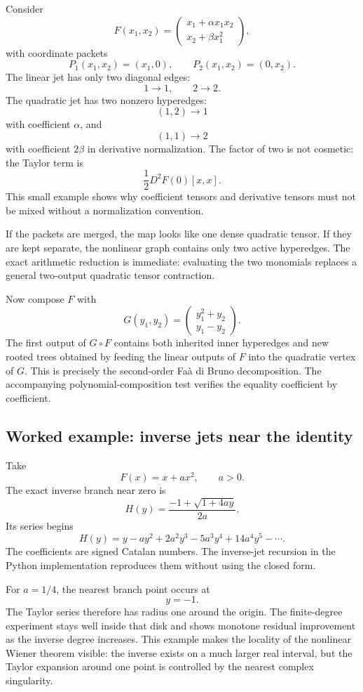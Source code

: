 \documentclass[11pt]{article}
\theoremstyle{definition}
\theoremstyle{remark}
\begin{document}
Consider
\[
F(x_1,x_2)
=
\begin{pmatrix}
x_1+\alpha x_1x_2\\
x_2+\beta x_1^2
\end{pmatrix},
\]
with coordinate packets
\[
P_1(x_1,x_2)=(x_1,0),
\qquad
P_2(x_1,x_2)=(0,x_2).
\]
The linear jet has only two diagonal edges:
\[
1\to1,
\qquad
2\to2.
\]
The quadratic jet has two nonzero hyperedges:
\[
(1,2)\to1
\]
with coefficient $\alpha$, and
\[
(1,1)\to2
\]
with coefficient $2\beta$ in derivative normalization.  The factor of two is not cosmetic: the Taylor term is
\[
\frac12D^2F(0)[x,x].
\]
This small example shows why coefficient tensors and derivative tensors must not be mixed without a normalization convention.

If the packets are merged, the map looks like one dense quadratic tensor.  If they are kept separate, the nonlinear graph contains only two active hyperedges.  The exact arithmetic reduction is immediate: evaluating the two monomials replaces a general two-output quadratic tensor contraction.

Now compose $F$ with
\[
G(y_1,y_2)
=
\begin{pmatrix}
y_1^2+y_2\\
y_1-y_2
\end{pmatrix}.
\]
The first output of $G\circ F$ contains both inherited inner hyperedges and new rooted trees obtained by feeding the linear outputs of $F$ into the quadratic vertex of $G$.  This is precisely the second-order Fa\`a di Bruno decomposition.  The accompanying polynomial-composition test verifies the equality coefficient by coefficient.

\subsection{Worked example: inverse jets near the identity}

Take
\[
F(x)=x+ax^2,
\qquad a>0.
\]
The exact inverse branch near zero is
\[
H(y)
=
\frac{-1+\sqrt{1+4ay}}{2a}.
\]
Its series begins
\[
H(y)
=
y-ay^2+2a^2y^3-5a^3y^4+14a^4y^5-\cdots.
\]
The coefficients are signed Catalan numbers.  The inverse-jet recursion in the Python implementation reproduces them without using the closed form.

For $a=1/4$, the nearest branch point occurs at
\[
y=-1.
\]
The Taylor series therefore has radius one around the origin.  The finite-degree experiment stays well inside that disk and shows monotone residual improvement as the inverse degree increases.  This example makes the locality of the nonlinear Wiener theorem visible: the inverse exists on a much larger real interval, but the Taylor expansion around one point is controlled by the nearest complex singularity.
\end{document}
